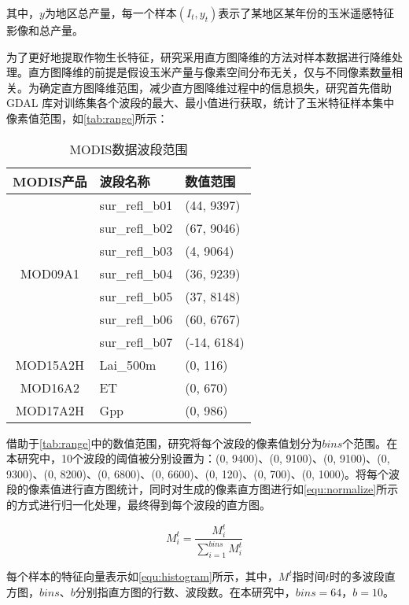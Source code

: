 \par 其中，$y$为地区总产量，每一个样本$(I_t, y_t)$表示了某地区某年份的玉米遥感特征影像和总产量。

\par 为了更好地提取作物生长特征，研究采用直方图降维的方法对样本数据进行降维处理。直方图降维的前提是假设玉米产量与像素空间分布无关，仅与不同像素数量相关。为确定直方图降维范围，减少直方图降维过程中的信息损失，研究首先借助 GDAL 库对训练集各个波段的最大、最小值进行获取，统计了玉米特征样本集中像素值范围，如\autoref{tab:range}所示：

\begin{table}
  \centering
  \caption{MODIS数据波段范围}
  \label{tab:range}
  \begin{tabularx}{\linewidth}{cX<{\centering}X<{\centering}}
    \toprule
    MODIS产品 & 波段名称 & 数值范围 \\
    \midrule
    & sur\_refl\_b01 & (44, 9397) \\
    & sur\_refl\_b02 & (67, 9046) \\
    & sur\_refl\_b03 & (4, 9064) \\
    MOD09A1 & sur\_refl\_b04 & (36, 9239) \\
    & sur\_refl\_b05 & (37, 8148) \\
    & sur\_refl\_b06 & (60, 6767) \\
    & sur\_refl\_b07 & (-14, 6184) \\ \hline
    MOD15A2H  & Lai\_500m & (0, 116) \\ \hline
    MOD16A2   & ET & (0, 670) \\ \hline
    MOD17A2H  & Gpp & (0, 986) \\
    \bottomrule
\end{tabularx}
\end{table}

\par 借助于\autoref{tab:range}中的数值范围，研究将每个波段的像素值划分为$bins$个范围。在本研究中，10个波段的阈值被分别设置为：(0, 9400)、(0, 9100)、(0, 9100)、(0, 9300)、(0, 8200)、(0, 6800)、(0, 6600)、(0, 120)、(0, 700)、(0, 1000)。将每个波段的像素值进行直方图统计，同时对生成的像素直方图进行如\autoref{equ:normalize}所示的方式进行归一化处理，最终得到每个波段的直方图。

\begin{equation}
  \label{equ:normalize}
  M^t_{i}=\frac{M^t_{i}}{\sum_{i=1}^{bins}M^t_{i}}
\end{equation}

\par 每个样本的特征向量表示如\autoref{equ:histogram}所示，其中，$M^t$指时间$t$时的多波段直方图，$bins$、$b$分别指直方图的行数、波段数。在本研究中，$bins=64$，$b=10$。

